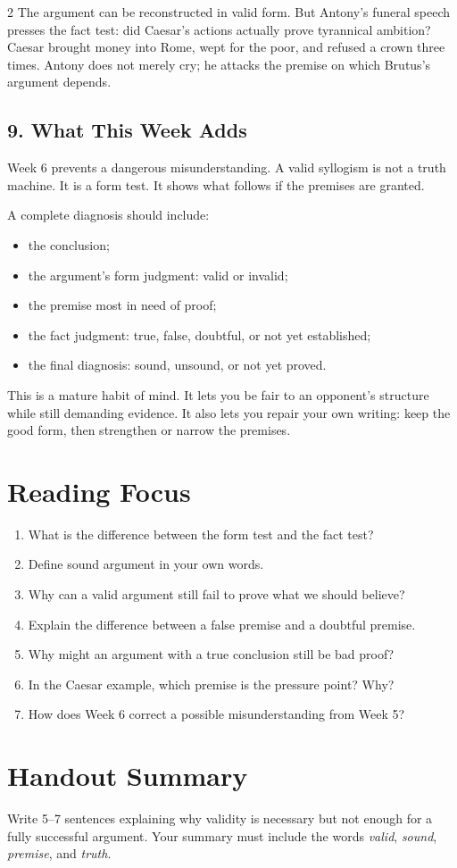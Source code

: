 \documentclass[12pt]{article}
\begin{document}
\begin{multicols}{2}
The argument can be reconstructed in valid form. But Antony's funeral speech presses the fact test: did Caesar's actions actually prove tyrannical ambition? Caesar brought money into Rome, wept for the poor, and refused a crown three times. Antony does not merely cry; he attacks the premise on which Brutus's argument depends.

\subsection*{9. What This Week Adds}
Week 6 prevents a dangerous misunderstanding. A valid syllogism is not a truth machine. It is a form test. It shows what follows if the premises are granted.

A complete diagnosis should include:
\begin{itemize}[leftmargin=*]
\item the conclusion;
\item the argument's form judgment: valid or invalid;
\item the premise most in need of proof;
\item the fact judgment: true, false, doubtful, or not yet established;
\item the final diagnosis: sound, unsound, or not yet proved.
\end{itemize}

This is a mature habit of mind. It lets you be fair to an opponent's structure while still demanding evidence. It also lets you repair your own writing: keep the good form, then strengthen or narrow the premises.

\section*{Reading Focus}
\begin{enumerate}[leftmargin=*]
\item What is the difference between the form test and the fact test?
\item Define sound argument in your own words.
\item Why can a valid argument still fail to prove what we should believe?
\item Explain the difference between a false premise and a doubtful premise.
\item Why might an argument with a true conclusion still be bad proof?
\item In the Caesar example, which premise is the pressure point? Why?
\item How does Week 6 correct a possible misunderstanding from Week 5?
\end{enumerate}

\section*{Handout Summary}
Write 5--7 sentences explaining why validity is necessary but not enough for a fully successful argument. Your summary must include the words \textit{valid}, \textit{sound}, \textit{premise}, and \textit{truth}.
\end{multicols}
\end{document}
